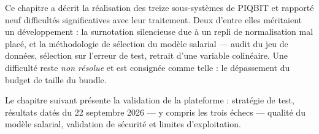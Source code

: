 Ce chapitre a décrit la réalisation des treize sous-systèmes de PIQBIT et
rapporté neuf difficultés significatives avec leur traitement. Deux d'entre
elles méritaient un développement : la surnotation silencieuse due à un repli
de normalisation mal placé, et la méthodologie de sélection du modèle
salarial — audit du jeu de données, sélection sur l'erreur de test, retrait
d'une variable colinéaire. Une difficulté reste \emph{non résolue} et est
consignée comme telle : le dépassement du budget de taille du bundle.

Le chapitre suivant présente la validation de la plateforme : stratégie de
test, résultats datés du 22 septembre 2026 — y compris les trois échecs —
qualité du modèle salarial, validation de sécurité et limites d'exploitation.
